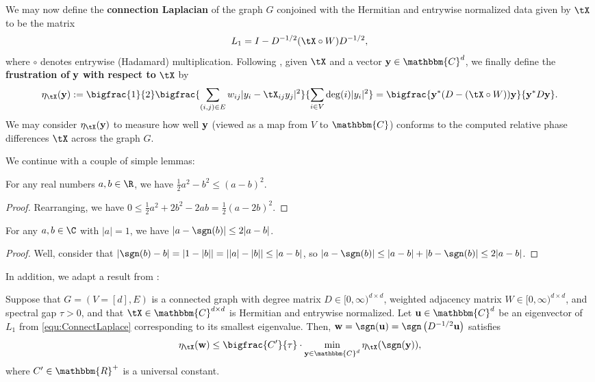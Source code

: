 We may now define the \textbf{connection Laplacian} of the graph $G$ conjoined with the Hermitian and entrywise normalized data given by $\tX$ to be the matrix 
\begin{equation}
L_1 = I - D^{-1/2} (\tX \circ W) D^{-1/2},
\label{equ:ConnectLaplace}
\end{equation}
where $\circ$ denotes entrywise (Hadamard) multiplication.
Following \cite{Cheeger}, given $\tX$ and a vector ${\bf y} \in \mathbbm{C}^d$, we finally define the \textbf{frustration of} $\bf y$ \textbf{with respect to} $\tX$ by 
\[\eta_{\tX}({\bf y}) := \bigfrac{1}{2}\bigfrac{\sum_{(i, j) \in E} w_{ij}|y_i - \tX_{ij} y_j |^2}{\sum_{i \in V} \deg(i) |y_i|^2} = \bigfrac{{\bf y}^* (D - (\tX \circ W)) {\bf y}}{{\bf y}^* D {\bf y}}.\]  
We may consider $\eta_{\tX}({\bf y})$ to measure how well ${\bf y}$ (viewed as a map from $V$ to $\mathbbm{C}$) conforms to the computed relative phase differences $\tX$ across the graph $G$.

We continue with a couple of simple lemmas:

\begin{lem}
  For any real numbers $a, b \in \R$, we have $\frac{1}{2} a^2 - b^2 \le (a - b)^2$.
  \label{lem:SimpGTB1}
\end{lem}

\begin{proof}  Rearranging, we have $0 \le \frac{1}{2} a^2 + 2b^2 - 2 a b = \frac{1}{2}(a - 2b)^2$. \end{proof}

\begin{lem} For any $a, b \in \C$ with $|a| = 1$, we have $|a - \sgn(b)| \le 2 |a - b|$. 
\label{lem:SimpGTB2}
\end{lem}

\begin{proof}  Well, consider that $|\sgn(b) - b| = |1 - |b| | = | |a| - |b| | \le |a - b|$, so $|a - \sgn(b)| \le |a - b| + |b - \sgn(b)| \le 2 |a - b|$. \end{proof}

In addition, we adapt a result from \cite{Cheeger}:

\begin{lem}  
Suppose that $G = (V=[d], E)$ is a connected graph with degree matrix $D \in [0,\infty)^{d \times d}$, weighted adjacency matrix $W \in [0,\infty)^{d \times d}$, and spectral gap $\tau > 0$, and that $\tX \in \mathbbm{C}^{d \times d}$ is Hermitian and entrywise normalized.  Let ${\bf u} \in \mathbbm{C}^d$ be an eigenvector of $L_1$ from \eqref{equ:ConnectLaplace} corresponding to its smallest eigenvalue.  Then, ${\bf w} = \sgn({\bf u}) = \sgn \left( D^{-1/2}{\bf u} \right)$ satisfies \[\eta_{\tX}({\bf w}) \le \bigfrac{C'}{\tau} \cdot \min_{{\bf y} \in \mathbbm{C}^d} \eta_{\tX}( \sgn({\bf y}) ),\] where $C' \in \mathbbm{R}^+$ is a universal constant.
\label{lem:CheegerInequality}
\end{lem}


